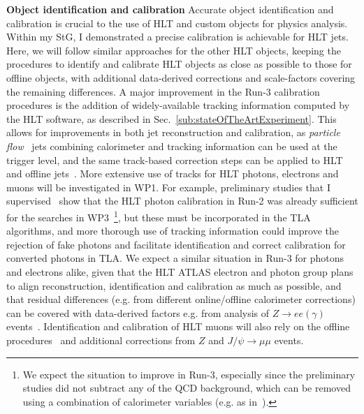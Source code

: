 \textbf{Object identification and calibration} Accurate object identification and calibration is crucial to the use of HLT and custom objects for physics analysis.
Within my StG, I demonstrated a precise calibration is achievable for HLT jets.
Here, we will follow similar approaches for the other HLT objects, keeping the procedures to identify and calibrate HLT objects as close as possible to those for offline objects, with additional data-derived corrections and scale-factors covering the remaining differences. 
A major improvement in the Run-3 calibration procedures is the addition of widely-available tracking information computed by the HLT software, as described in Sec.~\ref{sub:stateOfTheArtExperiment}. 
This allows for improvements in both jet reconstruction and calibration, as \textit{particle flow}~\cite{Aaboud:2017aca} %
jets combining calorimeter and tracking information can be used at the trigger level, and the same track-based correction steps can be applied to HLT and offline jets~\cite{Aaboud:2018fzt,PERF-2014-03,PERF-2016-04}. %
More extensive use of tracks for HLT photons, electrons and muons will be investigated in WP1.   
For example, preliminary studies that I supervised~\cite{8956089} %
show that the HLT photon calibration in Run-2 was already sufficient for the searches in WP3~\footnote{We expect the situation to improve in Run-3, especially since the preliminary studies did not subtract any of the QCD background, which can be removed using a combination of calorimeter variables (e.g. as in~\cite{STDM-2010-08}).}, but these must be incorporated in the TLA algorithms, and
more thorough use of tracking information could improve the rejection of fake photons and facilitate identification and correct calibration for converted photons in TLA.  
We expect a similar situation in Run-3 for photons and electrons alike, given that the HLT ATLAS electron and photon group plans to align reconstruction, identification and calibration as much as possible, and that residual differences (e.g. from different online/offline calorimeter corrections) can be covered with data-derived factors e.g. from analysis of $Z\rightarrow ee (\gamma)$ events~\cite{EGAM-2018-01}.  
Identification and calibration of HLT muons will also rely on the offline procedures~\cite{PERF-2015-10} %
and additional corrections from $Z$ and $J/\psi \rightarrow \mu\mu$ events. 

